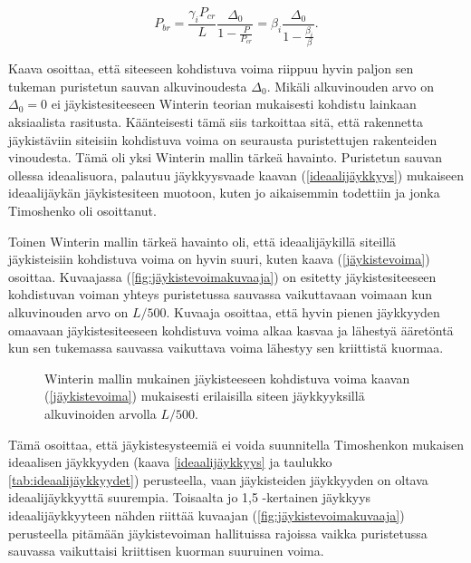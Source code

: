 \documentclass[12pt]{article}
\newenvironment{content}{\pagenumbering{arabic}}{}
\begin{document}
\begin{content}
\begin{equation}
\label{jäykistevoima}
P_{br} = \frac{\gamma_i P_{cr}}{L} \frac{\Delta_0}{1-\frac{P}{P_{cr}}} = \beta_i \frac{\Delta_0}{1-\frac{\beta_i}{\beta}}.
\end{equation}

Kaava osoittaa, että siteeseen kohdistuva voima riippuu hyvin paljon sen tukeman puristetun sauvan alkuvinoudesta $\Delta_0$. Mikäli alkuvinouden arvo on $\Delta_0 = 0$ ei jäykistesiteeseen Winterin teorian mukaisesti kohdistu lainkaan aksiaalista rasitusta. Käänteisesti tämä siis tarkoittaa sitä, että rakennetta jäykistäviin siteisiin kohdistuva voima on seurausta puristettujen rakenteiden vinoudesta. Tämä oli yksi Winterin mallin tärkeä havainto. Puristetun sauvan ollessa ideaalisuora, palautuu jäykkyysvaade kaavan (\ref{ideaalijäykkyys}) mukaiseen ideaalijäykän jäykistesiteen muotoon, kuten jo aikaisemmin todettiin ja jonka Timoshenko oli osoittanut. 

Toinen Winterin mallin tärkeä havainto oli, että ideaalijäykillä siteillä jäykisteisiin kohdistuva voima on hyvin suuri, kuten kaava (\ref{jäykistevoima}) osoittaa. Kuvaajassa (\ref{fig:jäykistevoimakuvaaja}) on esitetty jäykistesiteeseen kohdistuvan voiman yhteys puristetussa sauvassa vaikuttavaan voimaan kun alkuvinouden arvo on $L/500$. Kuvaaja osoittaa, että hyvin pienen jäykkyyden omaavaan jäykistesiteeseen kohdistuva voima alkaa kasvaa ja lähestyä ääretöntä kun sen tukemassa sauvassa vaikuttava voima lähestyy sen kriittistä kuormaa. 

\begin{figure}[htb]

\caption{Winterin \parencite{winter} mallin mukainen jäykisteeseen kohdistuva voima kaavan (\ref{jäykistevoima}) mukaisesti erilaisilla siteen jäykkyyksillä alkuvinoiden arvolla $L/500$.}
\end{figure}
\label{fig:jäykistevoimakuvaaja}

Tämä osoittaa, että jäykistesysteemiä ei voida suunnitella Timoshenkon mukaisen ideaalisen jäykkyyden (kaava \ref{ideaalijäykkyys} ja taulukko \ref{tab:ideaalijäykkyydet}) perusteella, vaan jäykisteiden jäykkyyden on oltava ideaalijäykkyyttä suurempia. Toisaalta jo 1,5 -kertainen jäykkyys ideaalijäykkyyteen nähden riittää kuvaajan (\ref{fig:jäykistevoimakuvaaja}) perusteella pitämään jäykistevoiman hallituissa rajoissa vaikka puristetussa sauvassa vaikuttaisi kriittisen kuorman suuruinen voima. 



\end{content}
\end{document}
